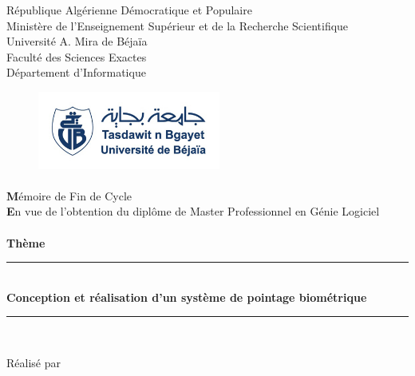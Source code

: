 
\begin{titlepage}

    \begin{center}

        \large{République Algérienne Démocratique et Populaire}\\
        \large{Ministère de l'Enseignement Supérieur et de la Recherche Scientifique}\\
        \large{Université A. Mira de Béjaïa}\\
        \large{Faculté des Sciences Exactes}\\
        \large{Département d'Informatique}\\


        \begin{figure}[h!]
            \centering
            \includegraphics[width=6cm]{images/logo.jpg}
        \end{figure}

        \paragraph{}
        {\LARGE{\textbf Mémoire de Fin de Cycle}} \\[2ex]
        \textbf En vue de l'obtention du diplôme de Master Professionnel en Génie Logiciel \\[1ex]
        \paragraph{}

        \textbf{Thème}\\[1ex]
        \rule{18cm}{1pt}
        {\Huge{\textbf{{\\
        Conception et réalisation d'un système de pointage biométrique \\}}}}
        \rule{18cm}{1pt}\\
        \vspace{0.2cm}

    \end{center}

    \begin{center}
        \large Réalisé par

\end{center}
\end{titlepage}
